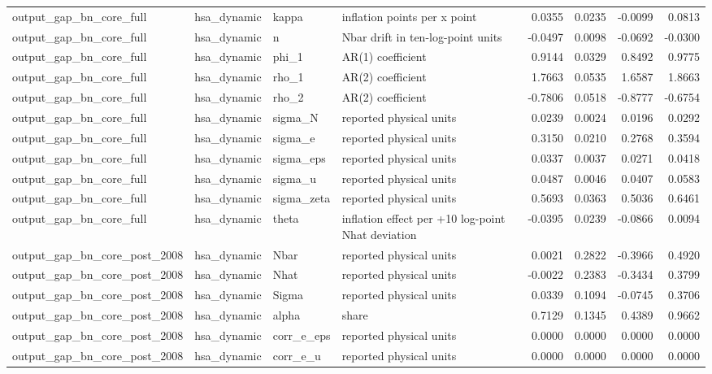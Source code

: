 \begin{tabular}{llllrrrr}
output\_gap\_bn\_core\_full & hsa\_dynamic & kappa & inflation points per x point & 0.0355 & 0.0235 & -0.0099 & 0.0813 \\
output\_gap\_bn\_core\_full & hsa\_dynamic & n & Nbar drift in ten-log-point units & -0.0497 & 0.0098 & -0.0692 & -0.0300 \\
output\_gap\_bn\_core\_full & hsa\_dynamic & phi\_1 & AR(1) coefficient & 0.9144 & 0.0329 & 0.8492 & 0.9775 \\
output\_gap\_bn\_core\_full & hsa\_dynamic & rho\_1 & AR(2) coefficient & 1.7663 & 0.0535 & 1.6587 & 1.8663 \\
output\_gap\_bn\_core\_full & hsa\_dynamic & rho\_2 & AR(2) coefficient & -0.7806 & 0.0518 & -0.8777 & -0.6754 \\
output\_gap\_bn\_core\_full & hsa\_dynamic & sigma\_N & reported physical units & 0.0239 & 0.0024 & 0.0196 & 0.0292 \\
output\_gap\_bn\_core\_full & hsa\_dynamic & sigma\_e & reported physical units & 0.3150 & 0.0210 & 0.2768 & 0.3594 \\
output\_gap\_bn\_core\_full & hsa\_dynamic & sigma\_eps & reported physical units & 0.0337 & 0.0037 & 0.0271 & 0.0418 \\
output\_gap\_bn\_core\_full & hsa\_dynamic & sigma\_u & reported physical units & 0.0487 & 0.0046 & 0.0407 & 0.0583 \\
output\_gap\_bn\_core\_full & hsa\_dynamic & sigma\_zeta & reported physical units & 0.5693 & 0.0363 & 0.5036 & 0.6461 \\
output\_gap\_bn\_core\_full & hsa\_dynamic & theta & inflation effect per +10 log-point Nhat deviation & -0.0395 & 0.0239 & -0.0866 & 0.0094 \\
output\_gap\_bn\_core\_post\_2008 & hsa\_dynamic & Nbar & reported physical units & 0.0021 & 0.2822 & -0.3966 & 0.4920 \\
output\_gap\_bn\_core\_post\_2008 & hsa\_dynamic & Nhat & reported physical units & -0.0022 & 0.2383 & -0.3434 & 0.3799 \\
output\_gap\_bn\_core\_post\_2008 & hsa\_dynamic & Sigma & reported physical units & 0.0339 & 0.1094 & -0.0745 & 0.3706 \\
output\_gap\_bn\_core\_post\_2008 & hsa\_dynamic & alpha & share & 0.7129 & 0.1345 & 0.4389 & 0.9662 \\
output\_gap\_bn\_core\_post\_2008 & hsa\_dynamic & corr\_e\_eps & reported physical units & 0.0000 & 0.0000 & 0.0000 & 0.0000 \\
output\_gap\_bn\_core\_post\_2008 & hsa\_dynamic & corr\_e\_u & reported physical units & 0.0000 & 0.0000 & 0.0000 & 0.0000 \\

\end{tabular}
